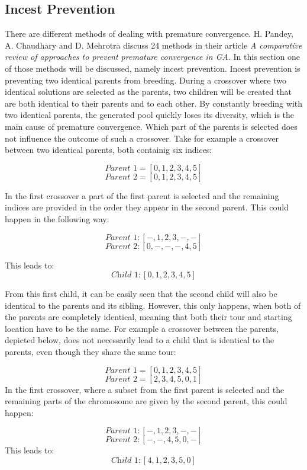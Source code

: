 \subsection{Incest Prevention}

\par
There are different methods of dealing with premature convergence. H. Pandey, A. Chaudhary and D. Mehrotra discuss 24 methods in their article \textit{A comparative review of approaches to prevent premature convergence in GA}\cite{Premconvergence}. In this section one of those methods will be discussed, namely incest prevention. Incest prevention is preventing two identical parents from breeding. During a crossover where two identical solutions are selected as the parents, two children will be created that are both identical to their parents and to each other. By constantly breeding with two identical parents, the generated pool quickly loses its diversity, which is the main cause of premature convergence. Which part of the parents is selected does not influence the outcome of such a crossover. Take for example a crossover between two identical parents, both containig six indices:

\[\textit{Parent 1} =  [0,1,2,3,4,5]\]  
\[\textit{Parent 2} =  [0,1,2,3,4,5]\]

\noindent In the first crossover a part of the first parent is selected and the remaining indices are provided in the order they appear in the second parent. This could happen in the following way: 

\[\textit{Parent 1}: [-,1,2,3,-,-]\]       
\[\textit{Parent 2}:[0,-,-,-,4,5]\]

This leads to: \[\textit{Child 1}: [0,1,2,3,4,5]\]
\par
From this first child, it can be easily seen that the second child will also be identical to the parents and its sibling. However, this only happens, when both of the parents are completely identical, meaning that both their tour and starting location have to be the same. For example a crossover between the parents, depicted below, does not necessarily lead to a child that is identical to the parents, even though they share the same tour:

\[\textit{Parent 1} =  [0,1,2,3,4,5]\] 
\[\textit{Parent 2} =  [2,3,4,5,0,1]\]
In the first crossover, where a subset from the first parent is selected and the remaining parts of the chromosome are given by the second parent, this could happen:

\[\textit{Parent 1}: [-,1,2,3,-,-]\]               
\[\textit{Parent 2}: [-,-,4,5,0,-]\]
This leads to: \[\textit{Child 1}: [4,1,2,3,5,0]\]

